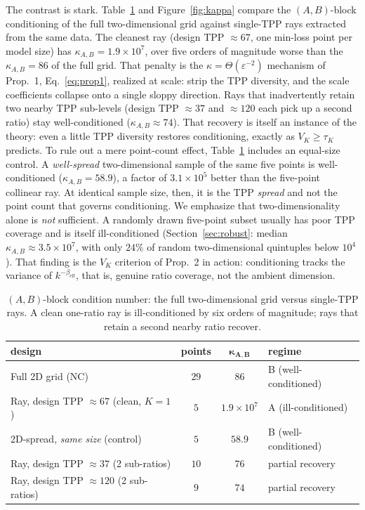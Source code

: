 \documentclass[11pt]{article}
\newcommand{\kAB}{\kappa_{A,B}}
\begin{document}
The contrast is stark. Table~\ref{tab:cond} and Figure~\ref{fig:kappa} compare the $(A,B)$-block
conditioning of the full two-dimensional grid against single-TPP rays extracted from the same
data. The cleanest ray (design TPP $\approx67$, one min-loss point per model size) has
$\kAB=1.9\times10^{7}$, over five orders of magnitude worse than the $\kAB=86$ of the full grid.
That penalty is the $\kappa=\Theta(\varepsilon^{-2})$ mechanism of Prop.~1, Eq.~\eqref{eq:prop1},
realized at scale: strip the TPP diversity, and the scale coefficients collapse onto a single
sloppy direction. Rays that inadvertently retain two nearby TPP sub-levels (design TPP
$\approx37$ and $\approx120$ each pick up a second ratio) stay well-conditioned
($\kAB\approx74$). That recovery is itself an instance of the theory: even a little TPP diversity
restores conditioning, exactly as $V_K\ge\tau_K$ predicts. To rule out a mere point-count effect,
Table~\ref{tab:cond} includes an equal-size control. A \emph{well-spread} two-dimensional sample
of the same five points is well-conditioned ($\kAB=58.9$), a factor of $3.1\times10^{5}$ better
than the five-point collinear ray. At identical sample size, then, it is the TPP \emph{spread}
and not the point count that governs conditioning. We emphasize that two-dimensionality alone is
\emph{not} sufficient. A randomly drawn five-point subset usually has poor TPP coverage and is
itself ill-conditioned (Section~\ref{sec:robust}: median $\kAB\approx3.5\times10^{7}$, with only
$24\%$ of random two-dimensional quintuples below $10^{4}$). That finding is the $V_K$ criterion
of Prop.~2 in action:
conditioning tracks the variance of $k^{-\beta_{\mathrm{eff}}}$, that is, genuine ratio coverage,
not the ambient dimension.

\begin{table}[t]
\centering
\caption{$(A,B)$-block condition number: the full two-dimensional grid versus single-TPP rays.
A clean one-ratio ray is ill-conditioned by six orders of magnitude; rays that retain a second
nearby ratio recover.}
\label{tab:cond}
\begin{tabular}{lccl}
\toprule
\textbf{design} & \textbf{points} & $\boldsymbol{\kAB}$ & \textbf{regime}\\
\midrule
Full 2D grid (NC)                    & $29$ & $86$                 & B (well-conditioned)\\
Ray, design TPP $\approx67$ (clean, $K{=}1$)  & $5$  & $1.9\times10^{7}$    & A (ill-conditioned)\\
2D-spread, \emph{same size} (control) & $5$  & $\mathbf{58.9}$      & B (well-conditioned)\\
Ray, design TPP $\approx37$ (2 sub-ratios) & $10$ & $76$           & partial recovery\\
Ray, design TPP $\approx120$ (2 sub-ratios)& $9$  & $74$           & partial recovery\\
\bottomrule
\end{tabular}
\end{table}
\end{document}
